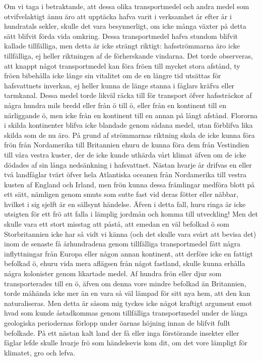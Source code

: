 Om vi taga i betraktande, att dessa olika transportmedel och andra medel som otvifvelaktigt ännu äro att upptäcka hafva varit i verksamhet år efter år i hundratals sekler, skulle det vara besynnerligt, om icke många växter på detta sätt blifvit förda vida omkring. Dessa transportmedel hafva stundom blifvit kallade tillfälliga, men detta är icke strängt riktigt: hafsströmmarna äro icke tillfälliga, ej heller riktningen af de förherskande vindarna. Det torde observeras, att knappt något transportmedel kan föra fröen till mycket stora afstånd, ty fröen bibehålla icke länge sin vitalitet om de en längre tid utsättas för hafsvattnets inverkan, ej heller kunna de länge stanna i fåglars kräfva eller tarmkanal. Dessa medel torde likväl räcka till för transport öfver hafssträckor af några hundra mils bredd eller från ö till ö, eller från en kontinent till en närliggande ö, men icke från en kontinent till en annan på långt afstånd. Flororna i skilda kontinenter blifva icke blandade genom sådana medel, utan förblifva lika skilda som de nu äro. På grund af strömmarnas riktning skola de icke kunna föra frön från Nordamerika till Britannien ehuru de kunna föra dem från Vestindien till våra vestra kuster, der de icke kunde uthärda vårt klimat äfven om de icke dödades af sin långa nedsänkning i hafsvattnet. Nästan hvarje år drifvas en eller två landfåglar tvärt öfver hela Atlantiska oceanen från Nordamerika till vestra kusten af England och Irland, men frön kunna dessa främlingar medföra blott på ett sätt, nämligen genom smuts som sutte fast vid deras fötter eller näbbar, hvilket i sig sjelft är en sällsynt händelse. Äfven i detta fall, huru ringa är icke utsigten för ett frö att falla i lämplig jordmån och komma till utveckling! Men det skulle vara ett stort misstag att påstå, att emedan en väl befolkad ö som Storbritannien icke har så vidt vi känna (och det skulle vara svårt att bevisa det) inom de senaste få århundradena genom tillfälliga transportmedel fått några inflyttningar från Europa eller någon annan kontinent, att derföre icke en fattigt befolkad ö, ehuru vida mera aflägsen från något fastland, skulle kunna erhålla några kolonister genom likartade medel. Af hundra frön eller djur som transporterades till en ö, äfven om denna vore mindre befolkad än Britannien, torde måhända icke mer än en vara så väl lämpad för sitt nya hem, att den kan naturaliseras. Men detta är såsom mig tyckes icke något kraftigt argument emot hvad som kunde åstadkommas genom tillfälliga transportmedel under de långa geologiska periodernas förlopp under öarnas höjning innan de blifvit fullt befolkade. På ett nästan kalt land der få eller inga förstörande insekter eller fåglar lefde skulle hvarje frö som händelsevis kom dit, om det vore lämpligt för klimatet, gro och lefva.



